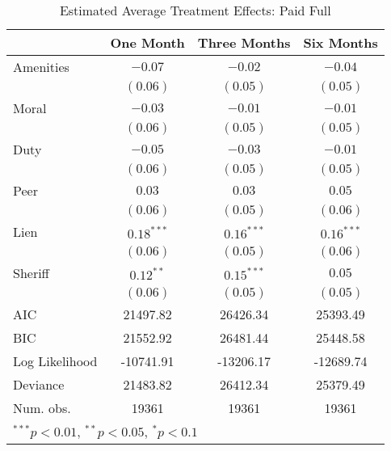 \documentclass[12pt,titlepage]{article}
\begin{document}
\begin{table}[htbp]
\caption{Estimated Average Treatment Effects: Paid Full}
\begin{center}
\begin{tabular}{l c c c }
\hline
               & One Month & Three Months & Six Months \\
\hline
Amenities      & $-0.07$      & $-0.02$      & $-0.04$      \\
               & $(0.06)$     & $(0.05)$     & $(0.05)$     \\
Moral          & $-0.03$      & $-0.01$      & $-0.01$      \\
               & $(0.06)$     & $(0.05)$     & $(0.05)$     \\
Duty           & $-0.05$      & $-0.03$      & $-0.01$      \\
               & $(0.06)$     & $(0.05)$     & $(0.05)$     \\
Peer           & $0.03$       & $0.03$       & $0.05$       \\
               & $(0.06)$     & $(0.05)$     & $(0.06)$     \\
Lien           & $0.18^{***}$ & $0.16^{***}$ & $0.16^{***}$ \\
               & $(0.06)$     & $(0.05)$     & $(0.06)$     \\
Sheriff        & $0.12^{**}$  & $0.15^{***}$ & $0.05$       \\
               & $(0.06)$     & $(0.05)$     & $(0.05)$     \\
\hline
AIC            & 21497.82     & 26426.34     & 25393.49     \\
BIC            & 21552.92     & 26481.44     & 25448.58     \\
Log Likelihood & -10741.91    & -13206.17    & -12689.74    \\
Deviance       & 21483.82     & 26412.34     & 25379.49     \\
Num. obs.      & 19361        & 19361        & 19361        \\
\hline
\multicolumn{4}{l}{\scriptsize{$^{***}p<0.01$, $^{**}p<0.05$, $^*p<0.1$}}
\end{tabular}
\label{tbl:reg_pf}
\end{center}
\end{table}
\end{document}
